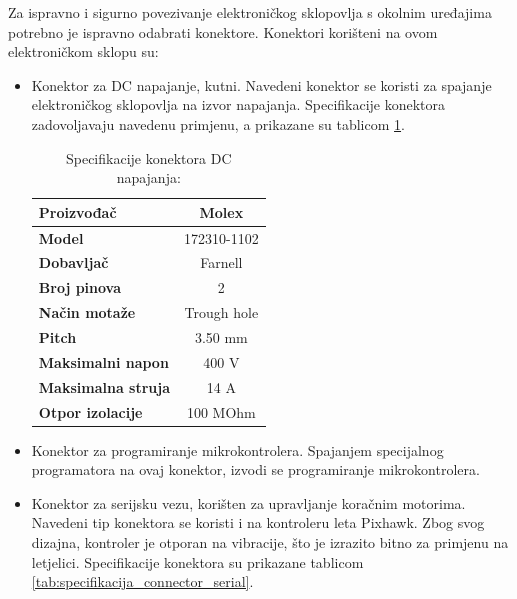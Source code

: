 \documentclass[11pt,a4paper]{article}
\begin{document}
Za ispravno i sigurno povezivanje elektroničkog sklopovlja s okolnim uređajima potrebno je ispravno odabrati konektore. Konektori korišteni na ovom elektroničkom sklopu su:
\begin{center}
	\begin{itemize}
		\item Konektor za DC napajanje, kutni. Navedeni konektor se koristi za spajanje elektroničkog sklopovlja na izvor napajanja. Specifikacije konektora zadovoljavaju navedenu primjenu, a prikazane su tablicom \ref{tab:specifikacija_supply_connector}.
		
\begin{table}[H]
	\centering
	\caption{Specifikacije konektora DC napajanja: }
	\label{tab:specifikacija_supply_connector}
	\begin{tabular}{|l|c|}
		\hline
		\textbf{Proizvođač} & Molex \\ \hline 
		\textbf{Model} & 172310-1102 \\ \hline 
		\textbf{Dobavljač} & Farnell \\ \hline 
		\textbf{Broj pinova} & 2 \\ \hline 
		\textbf{Način motaže} & Trough hole    \\ \hline
		\textbf{Pitch} & 3.50 mm    \\ \hline 
		\textbf{Maksimalni napon} & 400 V \\ \hline 
		\textbf{Maksimalna struja} & 14 A \\ \hline
		\textbf{Otpor izolacije} & 100 MOhm \\ \hline
	\end{tabular}
\end{table}		
		
		\item Konektor za programiranje mikrokontrolera. Spajanjem specijalnog programatora na ovaj konektor, izvodi se programiranje mikrokontrolera.
		
		\item Konektor za serijsku vezu, korišten za upravljanje koračnim motorima. Navedeni tip konektora se koristi i na kontroleru leta Pixhawk. Zbog svog dizajna, kontroler je otporan na vibracije, što je izrazito bitno za primjenu na letjelici. Specifikacije konektora su prikazane tablicom \ref{tab:specifikacija_connector_serial}.
		

\end{itemize}
\end{center}
\end{document}
